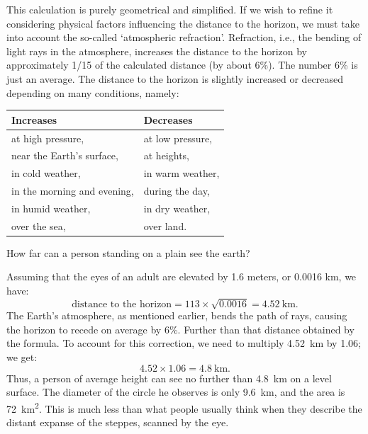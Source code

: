 This calculation is purely geometrical and simplified. If we wish to refine it considering physical factors influencing the distance to the horizon, we must take into account the so-called `atmospheric refraction'. Refraction, i.e., the bending of light rays in the atmosphere, increases the distance to the horizon by approximately 1/15 of the calculated distance (by about 6\%). The number 6\% is just an average. The distance to the horizon is slightly increased or decreased depending on many conditions, namely:

\begin{small}
\begin{center}
\begin{tabular}{p{3cm}p{3cm}}
\toprule
\textbf{Increases} & \textbf{Decreases} \\
\midrule
 at high pressure, &  at low pressure,\\
 near the Earth's surface, & at heights,\\
 in cold weather, & in warm weather,\\
 in the morning and evening, & during the day,\\
 in humid weather, & in dry weather,\\
 over the sea, & over land.\\
\bottomrule
\end{tabular}
\end{center}
\end{small}



\ques How far can a person standing on a plain see the earth? 

\ans Assuming that the eyes of an adult are elevated by 1.6 meters, or 0.0016 km, we have:
\begin{equation*}%
\text{distance to the horizon} = 113 \times \sqrt{0.0016} = \SI{4.52}{\kilo\meter}.
\end{equation*}
The Earth's atmosphere, as mentioned earlier, bends the path of rays, causing the horizon to recede on average by 6\%. Further than that distance obtained by the formula. To account for this correction, we need to multiply \SI{4.52}{\kilo\meter} by 1.06; we get: 
\begin{equation*}%
4.52 \times 1.06 = \SI{4.8}{\kilo\meter}.
\end{equation*}
Thus, a person of average height can see no further than \SI{4.8}{\kilo\meter} on a level surface. The diameter of the circle he observes is only \SI{9.6}{\kilo\meter}, and the area is \SI{72}{\kilo\meter\squared}. This is much less than what people usually think when they describe the distant expanse of the steppes, scanned by the eye.



